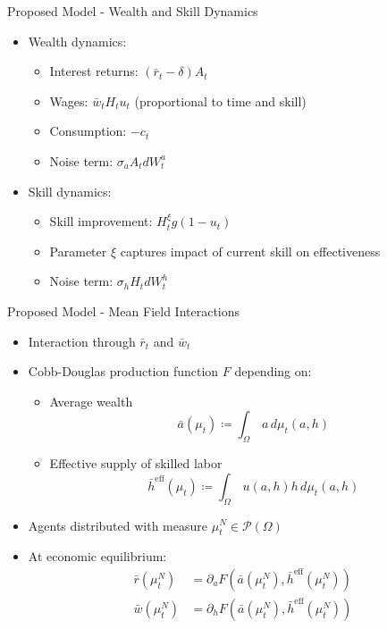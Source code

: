 \documentclass{beamer}
\newcommand{\heff}{\bar h^{\text{eff}}}
\begin{document}
\begin{frame}{Proposed Model - Wealth and Skill Dynamics}
\begin{itemize}
    \item Wealth dynamics:
    \begin{itemize}
        \item Interest returns: $(\bar r_t - \delta) A_t$
        \item Wages: $\bar w_t H_t u_t$ (proportional to time and skill)
        \item Consumption: $-c_t$
        \item Noise term: $\sigma_a A_t d W^a_t$
    \end{itemize}
    \item Skill dynamics:
    \begin{itemize}
        \item Skill improvement: $H^\xi_t g(1 - u_t)$
        \item Parameter $\xi$ captures impact of current skill on effectiveness
        \item Noise term: $\sigma_h H_t dW^h_t$
    \end{itemize}
\end{itemize}
\end{frame}

\begin{frame}{Proposed Model - Mean Field Interactions}
\begin{itemize}
    \item Interaction through $\bar r_t$ and $\bar w_t$
    \item Cobb-Douglas production function $F$ depending on:
    \begin{itemize}
        \item Average wealth 
        $$\bar a(\mu_t) \coloneqq \int_\Omega \, a \, d\mu_t (a,h)$$
        \item Effective supply of skilled labor 
        $$\heff(\mu_t) \coloneqq \int_\Omega \, u(a,h) h \, d\mu_t (a,h)$$
    \end{itemize}
    \item Agents distributed with measure $\mu^N_t \in \mathcal{P}(\Omega)$
    \item At economic equilibrium:
    \begin{align}
        \bar r(\mu^N_t) &= \partial_a F(\bar a(\mu^N_t), \heff(\mu^N_t))\\
        \bar w(\mu^N_t) &= \partial_h F(\bar a(\mu^N_t), \heff(\mu^N_t))
    \end{align}
\end{itemize}
\end{frame}
\end{document}
